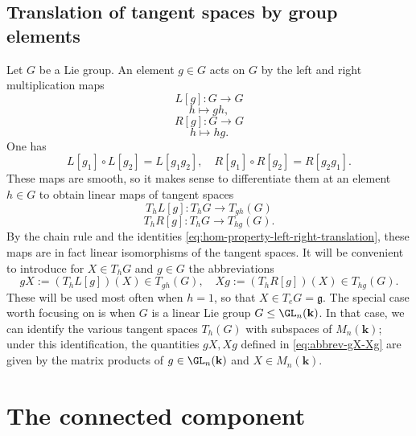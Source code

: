 \documentclass[reqno]{amsart} 
\begin{document}
\subsection{Translation of tangent spaces by group elements\label{sec:translate-tangent-spaces-gp-elts}}
\label{sec:org89c17c6}
Let $G$ be a Lie group.
An element $g \in G$
acts on $G$
by the left and right multiplication maps
\begin{equation*}
  L[g] : G \rightarrow G
\end{equation*}
\begin{equation*}
  h \mapsto g h,
\end{equation*}
\begin{equation*}
  R[g] : G \rightarrow G
\end{equation*}
\begin{equation*}
  h \mapsto h g.
\end{equation*}
One has
\begin{equation}\label{eq:hom-property-left-right-translation}
  L[g_1] \circ L[g_2] = L[g_1 g_2],
  \quad R[g_1] \circ R[g_2] = R[g_2 g_1].
\end{equation}
These maps are smooth, so it makes sense to differentiate
them at an element $h \in G$
to obtain linear maps of tangent spaces
\begin{equation*}
  T_h L[g] : T_{h} G \rightarrow T_{g h}(G)
\end{equation*}
\begin{equation*}
  T_h R[g] : T_{h} G \rightarrow T_{h g}(G).
\end{equation*}
By the chain rule and the identities \eqref{eq:hom-property-left-right-translation},
these maps are in fact linear isomorphisms of the tangent
spaces.
It will be convenient to introduce for $X \in T_h G$
and $g \in G$
the abbreviations
\begin{equation}\label{eq:abbrev-gX-Xg}
    g X := (T_h L[g])(X) \in T_{g h}(G),
  \quad 
  X g := (T_h R[g])(X) \in T_{h g}(G).
\end{equation}
These will be used most often when $h = 1$,
so that $X \in T_e G = \mathfrak{g}$.
The special case worth focusing on is
when $G$ is a linear Lie group $G \leq \GL_n(\mathbf{k})$.
In that case,
we can identify the various tangent spaces
$T_h(G)$
with subspaces of $M_n(\mathbf{k})$;
under this identification,
the quantities $g X, X g$ defined in \eqref{eq:abbrev-gX-Xg}
are given by the matrix products of $g \in \GL_n(\mathbf{k})$ and $X \in M_n(\mathbf{k})$.

\section{The connected component}
\label{sec:orgf603676}
\end{document}
